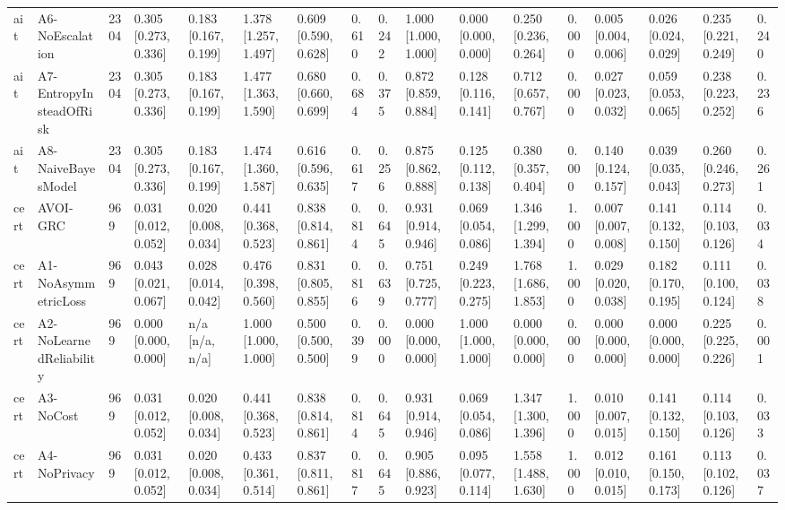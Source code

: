 \begin{table}[!ht]
{\begin{tabular}{lllllllllllllllll}
ait & A6-NoEscalation & 2304 & 0.305 [0.273, 0.336] & 0.183 [0.167, 0.199] & 1.378 [1.257, 1.497] & 0.609 [0.590, 0.628] & 0.610 & 0.242 & 1.000 [1.000, 1.000] & 0.000 [0.000, 0.000] & 0.250 [0.236, 0.264] & 0.000 & 0.005 [0.004, 0.006] & 0.026 [0.024, 0.029] & 0.235 [0.221, 0.249] & 0.240 \\
ait & A7-EntropyInsteadOfRisk & 2304 & 0.305 [0.273, 0.336] & 0.183 [0.167, 0.199] & 1.477 [1.363, 1.590] & 0.680 [0.660, 0.699] & 0.684 & 0.375 & 0.872 [0.859, 0.884] & 0.128 [0.116, 0.141] & 0.712 [0.657, 0.767] & 0.000 & 0.027 [0.023, 0.032] & 0.059 [0.053, 0.065] & 0.238 [0.223, 0.252] & 0.236 \\
ait & A8-NaiveBayesModel & 2304 & 0.305 [0.273, 0.336] & 0.183 [0.167, 0.199] & 1.474 [1.360, 1.587] & 0.616 [0.596, 0.635] & 0.617 & 0.256 & 0.875 [0.862, 0.888] & 0.125 [0.112, 0.138] & 0.380 [0.357, 0.404] & 0.000 & 0.140 [0.124, 0.157] & 0.039 [0.035, 0.043] & 0.260 [0.246, 0.273] & 0.261 \\
cert & AVOI-GRC & 969 & 0.031 [0.012, 0.052] & 0.020 [0.008, 0.034] & 0.441 [0.368, 0.523] & 0.838 [0.814, 0.861] & 0.814 & 0.645 & 0.931 [0.914, 0.946] & 0.069 [0.054, 0.086] & 1.346 [1.299, 1.394] & 1.000 & 0.007 [0.007, 0.008] & 0.141 [0.132, 0.150] & 0.114 [0.103, 0.126] & 0.034 \\
cert & A1-NoAsymmetricLoss & 969 & 0.043 [0.021, 0.067] & 0.028 [0.014, 0.042] & 0.476 [0.398, 0.560] & 0.831 [0.805, 0.855] & 0.816 & 0.639 & 0.751 [0.725, 0.777] & 0.249 [0.223, 0.275] & 1.768 [1.686, 1.853] & 1.000 & 0.029 [0.020, 0.038] & 0.182 [0.170, 0.195] & 0.111 [0.100, 0.124] & 0.038 \\
cert & A2-NoLearnedReliability & 969 & 0.000 [0.000, 0.000] & n/a [n/a, n/a] & 1.000 [1.000, 1.000] & 0.500 [0.500, 0.500] & 0.399 & 0.000 & 0.000 [0.000, 0.000] & 1.000 [1.000, 1.000] & 0.000 [0.000, 0.000] & 0.000 & 0.000 [0.000, 0.000] & 0.000 [0.000, 0.000] & 0.225 [0.225, 0.226] & 0.001 \\
cert & A3-NoCost & 969 & 0.031 [0.012, 0.052] & 0.020 [0.008, 0.034] & 0.441 [0.368, 0.523] & 0.838 [0.814, 0.861] & 0.814 & 0.645 & 0.931 [0.914, 0.946] & 0.069 [0.054, 0.086] & 1.347 [1.300, 1.396] & 1.000 & 0.010 [0.007, 0.015] & 0.141 [0.132, 0.150] & 0.114 [0.103, 0.126] & 0.033 \\
cert & A4-NoPrivacy & 969 & 0.031 [0.012, 0.052] & 0.020 [0.008, 0.034] & 0.433 [0.361, 0.514] & 0.837 [0.811, 0.861] & 0.817 & 0.645 & 0.905 [0.886, 0.923] & 0.095 [0.077, 0.114] & 1.558 [1.488, 1.630] & 1.000 & 0.012 [0.010, 0.015] & 0.161 [0.150, 0.173] & 0.113 [0.102, 0.126] & 0.037 \\

\end{tabular}}
\end{table}
